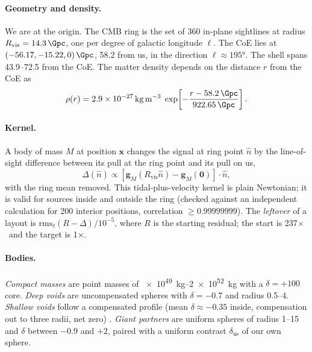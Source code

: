 \documentclass[aps,prd,twocolumn,nofootinbib,superscriptaddress,floatfix]{revtex4-2}
\newcommand{\fl}{\ensuremath{\times}}
\begin{document}
\paragraph*{Geometry and density.} We are at the origin. The CMB ring is the set of 360 in-plane sightlines at radius $R_\mathrm{vis}=\SI{14.3}{\Gpc}$, one per degree of galactic longitude $\ell$. The CoE lies at $(-56.17,-15.22,0)\,\si{\Gpc}$, \SI{58.2}{\Gpc} from us, in the direction $\ell\approx\ang{195}$. The shell spans \SIrange{43.9}{72.5}{\Gpc} from the CoE. The matter density depends on the distance $r$ from the CoE as
\begin{equation}
\rho(r)=\SI{2.9e-27}{\kilo\gram\per\cubic\meter}\;\exp\!\left[-\frac{r-\SI{58.2}{\Gpc}}{\SI{922.65}{\Gpc}}\right].
\end{equation}

\paragraph*{Kernel.} A body of mass $M$ at position $\mathbf{x}$ changes the signal at ring point $\hat n$ by the line-of-sight difference between its pull at the ring point and its pull on us,
\begin{equation}
\Delta(\hat n)\propto\left[\mathbf{g}_M(R_\mathrm{vis}\hat n)-\mathbf{g}_M(\mathbf{0})\right]\cdot\hat n ,
\end{equation}
with the ring mean removed. This tidal-plus-velocity kernel is plain Newtonian; it is valid for sources inside and outside the ring (checked against an independent calculation for 200 interior positions, correlation $\geq0.99999999$). The \emph{leftover} of a layout is $\mathrm{rms}_\ell(R-\Delta)/10^{-5}$, where $R$ is the starting residual; the start is 237\fl\ and the target is 1\fl.

\paragraph*{Bodies.} \emph{Compact masses} are point masses of \SIrange{e49}{2e52}{\kilo\gram} with a $\delta=+100$ core. \emph{Deep voids} are uncompensated spheres with $\delta=-0.7$ and radius \SIrange{0.5}{4}{\Gpc}. \emph{Shallow voids} follow a compensated profile (mean $\delta\approx-0.35$ inside, compensation out to three radii, net zero) \cite{ClampittJain2015}. \emph{Giant partners} are uniform spheres of radius \SIrange{1}{15}{\Gpc} and $\delta$ between $-0.9$ and $+2$, paired with a uniform contrast $\delta_\mathrm{us}$ of our own sphere.
\end{document}
